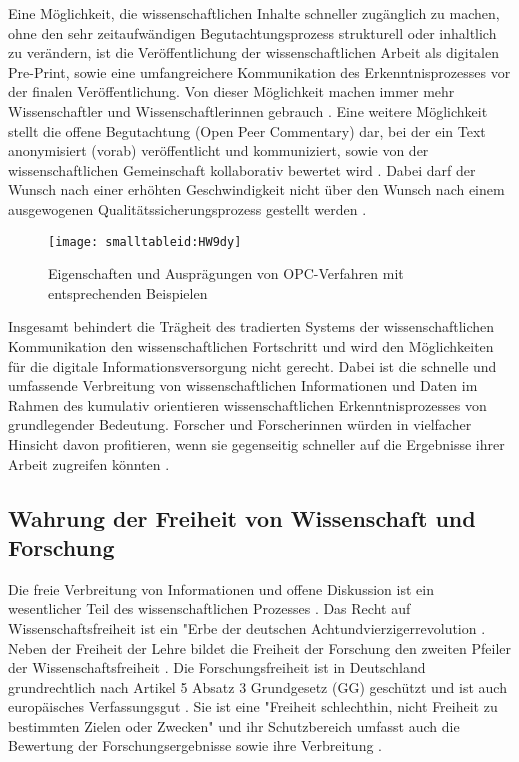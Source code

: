 Eine Möglichkeit, die wissenschaftlichen Inhalte schneller zugänglich zu machen, ohne den sehr zeitaufwändigen Begutachtungsprozess strukturell oder inhaltlich zu verändern, ist die Veröffentlichung der wissenschaftlichen Arbeit als digitalen Pre-Print, sowie eine umfangreichere Kommunikation des Erkenntnisprozesses vor der finalen Veröffentlichung. Von dieser Möglichkeit machen immer mehr Wissenschaftler und Wissenschaftlerinnen gebrauch \cite{Curry_2015}. Eine weitere Möglichkeit stellt die offene Begutachtung (Open Peer Commentary) dar, bei der ein Text anonymisiert (vorab) veröffentlicht und kommuniziert, sowie von der wissenschaftlichen Gemeinschaft kollaborativ bewertet wird \cite{Mueller_2009} \cite{Smith_2006}. Dabei darf der Wunsch nach einer erhöhten Geschwindigkeit nicht über den Wunsch nach einem ausgewogenen Qualitätssicherungsprozess gestellt werden \cite{Beall_2012}.

\begin{figure}[h!]
\texttt{[image: smalltableid:HW9dy]}
\caption{Eigenschaften und Ausprägungen von OPC-Verfahren mit entsprechenden Beispielen}
\end{figure}

Insgesamt behindert die Trägheit des tradierten Systems der wissenschaftlichen Kommunikation den wissenschaftlichen Fortschritt und wird den Möglichkeiten für die digitale Informationsversorgung nicht gerecht. Dabei ist die schnelle und umfassende Verbreitung von wissenschaftlichen Informationen und Daten im Rahmen des kumulativ orientieren wissenschaftlichen Erkenntnisprozesses von grundlegender Bedeutung. Forscher und Forscherinnen würden in vielfacher Hinsicht davon profitieren, wenn sie gegenseitig schneller auf die Ergebnisse ihrer Arbeit zugreifen könnten \cite{Nosek_2012} \cite{Winkler_2011}.

\subsection{Wahrung der Freiheit von Wissenschaft und Forschung}

Die freie Verbreitung von Informationen und offene Diskussion ist ein wesentlicher Teil des wissenschaftlichen Prozesses \cite{Edsall_1976}. Das Recht auf Wissenschaftsfreiheit ist ein "Erbe der deutschen Achtundvierzigerrevolution \cite{Kempny_2013}. Neben der Freiheit der Lehre bildet die Freiheit der Forschung den zweiten Pfeiler der Wissenschaftsfreiheit \cite[:46]{Thurnherr_2014} \cite{Meier_2009}. Die Forschungsfreiheit ist in Deutschland grundrechtlich nach Artikel 5 Absatz 3 Grundgesetz (GG) geschützt und ist auch europäisches Verfassungsgut \cite{Kempny_2013}. Sie ist eine "Freiheit schlechthin, nicht Freiheit zu bestimmten Zielen oder Zwecken" \cite[:1530]{Boeckenfoerde_1974} und ihr Schutzbereich umfasst auch die Bewertung der Forschungsergebnisse sowie ihre Verbreitung \cite[:429]{Pfeiffer_2013}.

